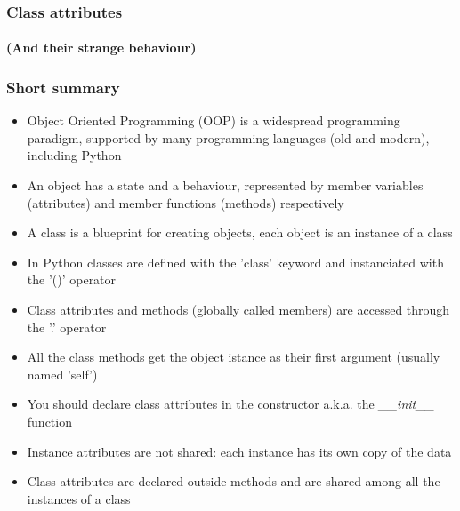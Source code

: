 \documentclass[9pt]{beamer}
\begin{document}
\begin{frame}
  \frametitle{Class attributes}
  \framesubtitle{(And their strange behaviour)}
  
\end{frame}


\begin{frame}
  \frametitle{Short summary}
  
  \begin{itemize}
    \footnotesize
    \item Object Oriented Programming (OOP) is a widespread programming paradigm,
          supported by many programming languages (old and modern), including Python
    \medskip
    \item An object has a state and a behaviour, represented by member variables (attributes)
          and member functions (methods) respectively
    \medskip
    \item A class is a blueprint for creating objects, each object is an instance of a class
    \medskip
    \item In Python classes are defined with the 'class' keyword and instanciated with the '()' operator
    \medskip
    \item Class attributes and methods (globally called members) are accessed through the '.' operator
    \medskip
    \item All the class methods get the object istance as their first argument (usually named 'self')
    \medskip
    \item You should declare class attributes in the constructor a.k.a. the \emph{\_\_init\_\_} function
    \medskip
    \item Instance attributes are not shared: each instance has its own copy of the data
    \medskip
    \item Class attributes are declared outside methods and are shared among all the instances of a class
  \end{itemize}
  
\end{frame}
\end{document}

